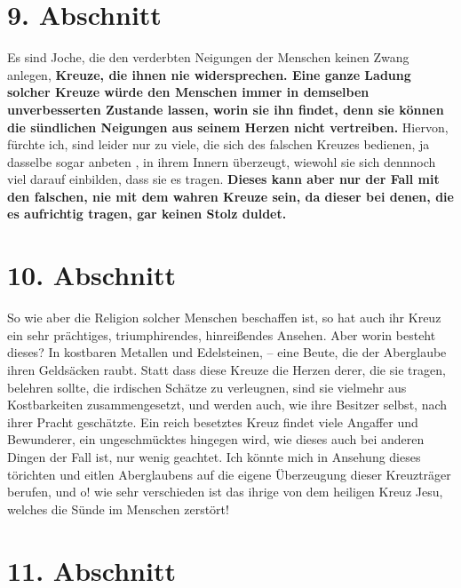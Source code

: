 \section{9. Abschnitt} \label{kap5_ab9}

\label{ref:05_09_kreuz}
Es sind Joche, die den verderbten Neigungen der Menschen keinen Zwang anlegen,
\textbf{Kreuze, die ihnen nie widersprechen. Eine ganze Ladung solcher Kreuze
würde den
Menschen immer in demselben unverbesserten Zustande lassen, worin sie ihn
findet, denn sie können die sündlichen Neigungen aus seinem Herzen nicht
vertreiben.} Hiervon, fürchte ich, sind leider nur zu viele, die sich des
falschen Kreuzes  bedienen, ja dasselbe sogar anbeten
, in ihrem Innern überzeugt,
wiewohl sie sich dennnoch viel darauf einbilden, dass sie es tragen.
\textbf{Dieses kann
aber nur der Fall mit den falschen, nie mit dem wahren Kreuze sein, da dieser
bei denen, die es aufrichtig tragen, gar keinen Stolz duldet.}

\section{10. Abschnitt} \label{kap5_ab10}

So wie aber die Religion solcher Menschen beschaffen ist, so hat auch ihr Kreuz
ein sehr prächtiges, triumphirendes, hinreißendes Ansehen. Aber worin besteht
dieses? In kostbaren Metallen und Edelsteinen, -- eine Beute, die der Aberglaube
ihren Geldsäcken raubt. Statt dass diese Kreuze die Herzen derer, die sie
tragen,
belehren sollte, die irdischen Schätze zu verleugnen, sind sie vielmehr aus
Kostbarkeiten zusammengesetzt, und werden auch, wie ihre Besitzer selbst, nach
ihrer Pracht geschätzte. Ein reich besetztes Kreuz findet viele Angaffer und
Bewunderer, ein ungeschmücktes hingegen wird, wie dieses auch bei anderen Dingen
der Fall ist, nur wenig geachtet. Ich könnte mich in Ansehung dieses törichten
und eitlen Aberglaubens  auf die eigene Überzeugung dieser
Kreuzträger berufen,
und o! wie sehr verschieden ist das ihrige von dem heiligen Kreuz Jesu,
welches die Sünde im Menschen zerstört!

\section{11. Abschnitt} \label{kap5_ab11}

